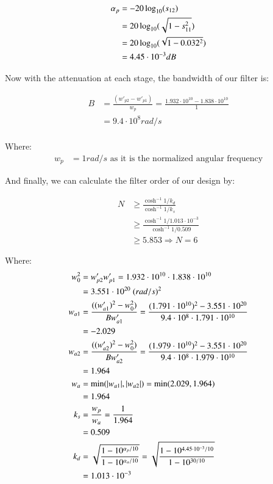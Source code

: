 \documentclass[12pt]{report} %
\begin{document}
\begin{align*}
\alpha_{p} &= - 20 \* \log_{10}(s_{12}) \\
&= \-20 \* \log_{10}(\sqrt{1 - s_{11}^2}) \\
&= \-20 \* \log_{10}(\sqrt{1 - 0.032^2}) \\
&= 4.45 \cdot 10^{-3} dB
\end{align*}

Now with the attenuation at each stage, the bandwidth of our filter is:

\begin{align*}
B &= \frac{(w'_{p2} - w'_{p1})}{w_p} = \frac{1.932 \cdot 10^{10} - 1.838 \cdot 10^{10}}{1} \\
&= 9.4 \cdot 10^{8} rad/s \\
\end{align*}

Where:
\begin{align*}
w_p &= 1 rad/s \text{ as it is the normalized angular frequency}
\end{align*}

And finally, we can calculate the filter order of our design by:

\begin{align*}
N &\geq \frac{\cosh^{-1}{1/k_d}}{\cosh^{-1}{1/k_s}} \\
&\geq \frac{\cosh^{-1}{1/1.013 \cdot 10^{-3}}}{\cosh^{-1}{1/0.509}} \\
&\geq 5.853 \Rightarrow N = 6
\end{align*}

Where:
\begin{align*}
w_0^2 &= w'_{p2} \* w'_{p1} = 1.932 \cdot 10^{10} \cdot 1.838 \cdot 10^{10} \\
&= 3.551 \cdot 10^{20} \ (rad/s)^2 \\
w_{a1} &= \frac{((w'_{a1})^2 - w_{0}^2)}{B \* w'_{a1}} = \frac{(1.791 \cdot 10^{10})^2 - 3.551 \cdot 10^{20}}{9.4 \cdot 10^8 \cdot 1.791 \cdot 10^{10}} \\
&= -2.029 \\
w_{a2} &= \frac{((w'_{a2})^2 - w_{0}^2)}{B \* w'_{a2}} = \frac{(1.979 \cdot 10^{10})^2 - 3.551 \cdot 10^{20}}{9.4 \cdot 10^8 \cdot 1.979 \cdot 10^{10}} \\
&= 1.964 \\
w_a &= \min (|w_{a1} |, |w_{a2}|) = \min (2.029, 1.964) \\
&= 1.964 \\
k_s &= \frac{w_p}{w_a} = \frac{1}{1.964} \\
&= 0.509 \\
k_d &= \sqrt{\frac{1 - 10^{\alpha_p / 10}}{1 - 10^{\alpha_a / 10}}} = \sqrt{\frac{1 - 10^{4.45 \cdot 10^{-3} / 10}}{1 - 10^{30 / 10}}} \\
&= 1.013 \cdot 10^{-3}
\end{align*}
\end{document}
